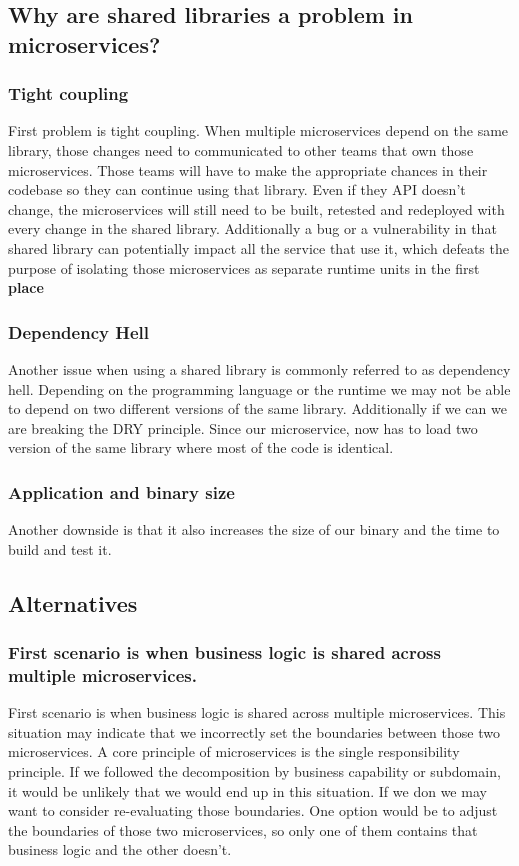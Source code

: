 \subsection{Why are shared libraries a problem in microservices?}

\subsubsection{Tight coupling}
First problem is tight coupling.
When multiple microservices depend on the same library, those changes need to communicated to other teams that own those microservices.
Those teams will have to make the appropriate chances in their codebase so they can continue using that library.
Even if they API doesn't change, the microservices will still need to be built, retested and redeployed with every change in the shared library.
Additionally a bug or a vulnerability in that shared library can potentially impact all the service that use it, which defeats the purpose of isolating those microservices as separate runtime units in the first \textbf{place}

\subsubsection{Dependency Hell}
Another issue when using a shared library is commonly referred to as dependency hell.
Depending on the programming language or the runtime we may not be able to depend on two different versions of the same library.
Additionally if we can we are breaking the DRY principle.
Since our microservice, now has to load two version of the same library where most of the code is identical.

\subsubsection{Application and binary size}
Another downside is that it also increases the size of our binary and the time to build and test it.

\subsection{Alternatives}

\subsubsection{First scenario is when business logic is shared across multiple microservices.}
First scenario is when business logic is shared across multiple microservices.
This situation may indicate that we incorrectly set the boundaries between those two microservices.
A core principle of microservices is the single responsibility principle.
If we followed the decomposition by business capability or subdomain, it would be unlikely that we would end up in this situation.
If we don we may want to consider re-evaluating those boundaries.
One option would be to adjust the boundaries of those two microservices, so only one of them contains that business logic and the other doesn't.

